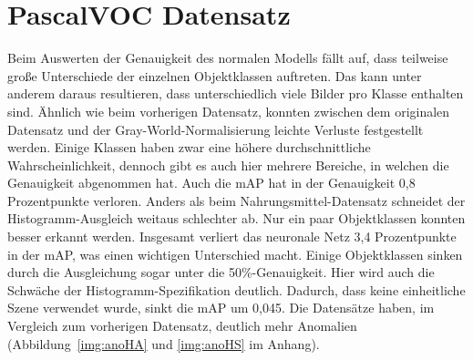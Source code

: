 \section{PascalVOC Datensatz}
Beim Auswerten der Genauigkeit des normalen Modells fällt auf, dass teilweise große Unterschiede der einzelnen Objektklassen auftreten. Das kann unter anderem daraus resultieren, dass unterschiedlich viele Bilder pro Klasse enthalten sind. Ähnlich wie beim vorherigen Datensatz, konnten zwischen dem originalen Datensatz und der Gray-World-Normalisierung leichte Verluste festgestellt werden. Einige Klassen haben zwar eine höhere durchschnittliche Wahrscheinlichkeit, dennoch gibt es auch hier mehrere Bereiche, in welchen die Genauigkeit abgenommen hat. Auch die mAP hat in der Genauigkeit 0,8 Prozentpunkte verloren. Anders als beim Nahrungsmittel-Datensatz schneidet der Histogramm-Ausgleich weitaus schlechter ab. Nur ein paar Objektklassen konnten besser erkannt werden. Insgesamt verliert das neuronale Netz 3,4 Prozentpunkte in der mAP, was einen wichtigen Unterschied macht. Einige Objektklassen sinken durch die Ausgleichung sogar unter die 50\%-Genauigkeit. Hier wird auch die Schwäche der Histogramm-Spezifikation deutlich. Dadurch, dass keine einheitliche Szene verwendet wurde, sinkt die mAP um 0,045. Die Datensätze haben, im Vergleich zum vorherigen Datensatz, deutlich mehr Anomalien (Abbildung~\ref{img:anoHA} und \ref{img:anoHS} im Anhang).
